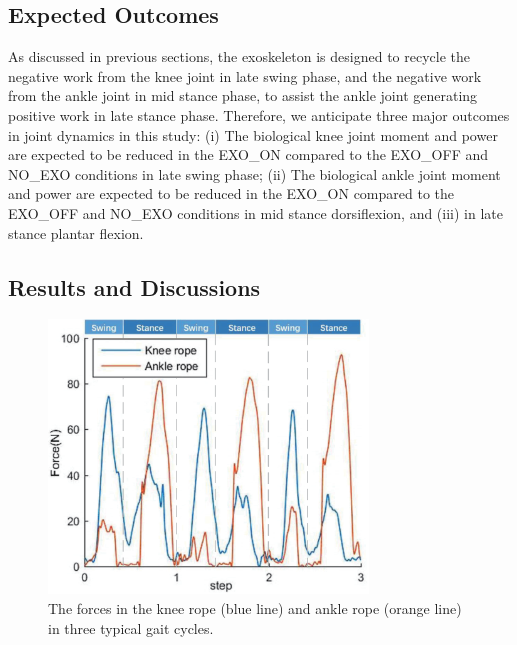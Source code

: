 \documentclass[10pt]{asme2ej}
\begin{document}
\subsection{Expected Outcomes}

As discussed in previous sections, the exoskeleton is designed to recycle the negative work from the knee joint in late swing phase, and the negative work from the ankle joint in mid stance phase, to assist the ankle joint generating positive work in late stance phase.
Therefore, we anticipate three major outcomes in joint dynamics in this study:
(i) The biological knee joint moment and power are expected to be reduced in the EXO\_ON compared to the EXO\_OFF and NO\_EXO conditions in late swing phase;
(ii) The biological ankle joint moment and power are expected to be reduced in the EXO\_ON compared to the EXO\_OFF and NO\_EXO conditions in mid stance dorsiflexion, and (iii) in late stance plantar flexion.

\subsection{Results and Discussions}

\begin{figure}[b]
	\centering
	\includegraphics[width=8.5cm]{forces.eps}
	\caption{The forces in the knee rope (blue line) and ankle rope (orange line) in three typical gait cycles.}
	\label{fig:force}
\end{figure}
\end{document}
